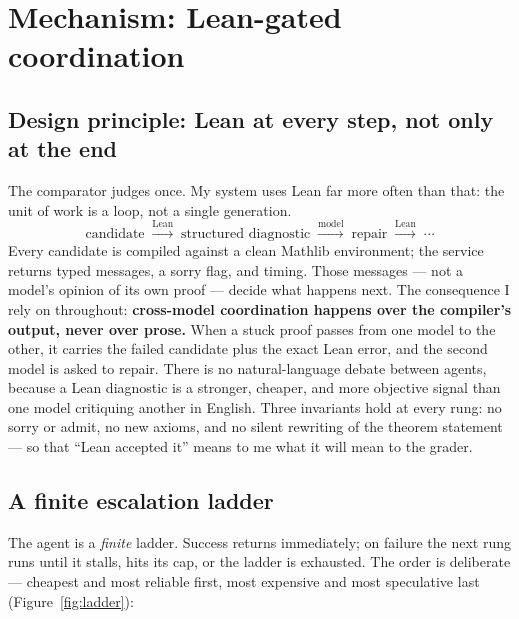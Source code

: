 \section{Mechanism: Lean-gated coordination}
\label{sec:mechanism}

\subsection{Design principle: Lean at every step, not only at the end}
The comparator judges once. My system uses Lean far more often than that: the
unit of work is a loop, not a single generation.
\[
\text{candidate}
\;\xrightarrow{\text{Lean}}\;
\text{structured diagnostic}
\;\xrightarrow{\text{model}}\;
\text{repair}
\;\xrightarrow{\text{Lean}}\;
\cdots
\]
Every candidate is compiled against a clean Mathlib environment; the service
returns typed messages, a sorry flag, and timing. Those messages --- not a
model's opinion of its own proof --- decide what happens next. The consequence I
rely on throughout: \textbf{cross-model coordination happens over the compiler's
output, never over prose.} When a stuck proof passes from one model to the other,
it carries the failed candidate plus the exact Lean error, and the second model
is asked to repair. There is no natural-language debate between agents, because a
Lean diagnostic is a stronger, cheaper, and more objective signal than one model
critiquing another in English. Three invariants hold at every rung: no sorry or
admit, no new axioms, and no silent rewriting of the theorem statement --- so
that ``Lean accepted it'' means to me what it will mean to the grader.

\subsection{A finite escalation ladder}
The agent is a \emph{finite} ladder. Success returns immediately; on failure the
next rung runs until it stalls, hits its cap, or the ladder is exhausted. The
order is deliberate --- cheapest and most reliable first, most expensive and most
speculative last (Figure~\ref{fig:ladder}):


